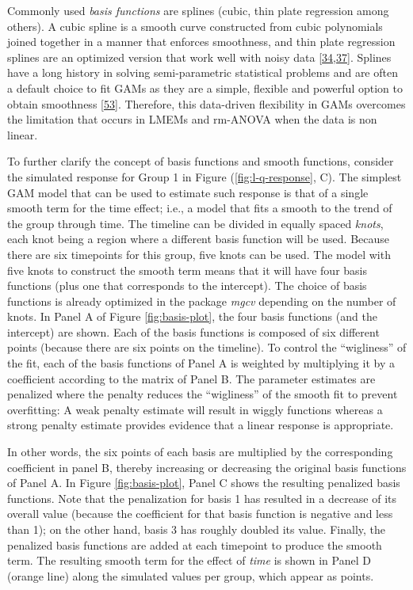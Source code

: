 \documentclass[
]{article}
\begin{document}
Commonly used \emph{basis functions} are splines (cubic, thin plate regression among others). A cubic spline is a smooth curve constructed from cubic polynomials joined together in a manner that enforces smoothness, and thin plate regression splines are an optimized version that work well with noisy data {[}\protect\hyperlink{ref-simpson2018}{34},\protect\hyperlink{ref-wood2017}{37}{]}. Splines have a long history in solving semi-parametric statistical problems and are often a default choice to fit GAMs as they are a simple, flexible and powerful option to obtain smoothness {[}\protect\hyperlink{ref-wegman1983}{53}{]}. Therefore, this data-driven flexibility in GAMs overcomes the limitation that occurs in LMEMs and rm-ANOVA when the data is non linear.

To further clarify the concept of basis functions and smooth functions, consider the simulated response for Group 1 in Figure (\ref{fig:l-q-response}, C). The simplest GAM model that can be used to estimate such response is that of a single smooth term for the time effect; i.e., a model that fits a smooth to the trend of the group through time. The timeline can be divided in equally spaced \emph{knots}, each knot being a region where a different basis function will be used. Because there are six timepoints for this group, five knots can be used. The model with five knots to construct the smooth term means that it will have four basis functions (plus one that corresponds to the intercept). The choice of basis functions is already optimized in the package \emph{mgcv} depending on the number of knots. In Panel A of Figure \ref{fig:basis-plot}, the four basis functions (and the intercept) are shown. Each of the basis functions is composed of six different points (because there are six points on the timeline). To control the ``wigliness'' of the fit, each of the basis functions of Panel A is weighted by multiplying it by a coefficient according to the matrix of Panel B. The parameter estimates are penalized where the penalty reduces the ``wigliness'' of the smooth fit to prevent overfitting: A weak penalty estimate will result in wiggly functions whereas a strong penalty estimate provides evidence that a linear response is appropriate.

In other words, the six points of each basis are multiplied by the corresponding coefficient in panel B, thereby increasing or decreasing the original basis functions of Panel A. In Figure \ref{fig:basis-plot}, Panel C shows the resulting penalized basis functions. Note that the penalization for basis 1 has resulted in a decrease of its overall value (because the coefficient for that basis function is negative and less than 1); on the other hand, basis 3 has roughly doubled its value. Finally, the penalized basis functions are added at each timepoint to produce the smooth term. The resulting smooth term for the effect of \emph{time} is shown in Panel D (orange line) along the simulated values per group, which appear as points.
\end{document}
